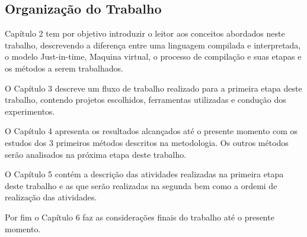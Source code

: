 \subsection{Organização do Trabalho}

Capítulo 2 tem por objetivo introduzir o leitor aos conceitos abordados
 neste trabalho, descrevendo a diferença entre uma linguagem compilada e
 interpretada, o modelo Just-in-time, Maquina virtual, o processo de compilação
 e suas etapas e os métodos a serem trabalhados.

O Capítulo 3 descreve um fluxo de trabalho realizado para a primeira etapa
 deste trabalho, contendo projetos escolhidos, ferramentas utilizadas e
 condução dos experimentos.

O Capítulo 4 apresenta os resultados alcançados até o presente momento com
 os estudos dos 3 primeiros métodos descritos na metodologia. Os outros
 métodos serão analisados na próxima etapa deste trabalho.

O Capítulo 5 contém a descrição das atividades realizadas na primeira
 etapa deste trabalho e as que serão realizadas na segunda bem como a ordemi
 de realização das atividades.

Por fim o Capítulo 6  faz as considerações finais do trabalho até o presente
 momento.

